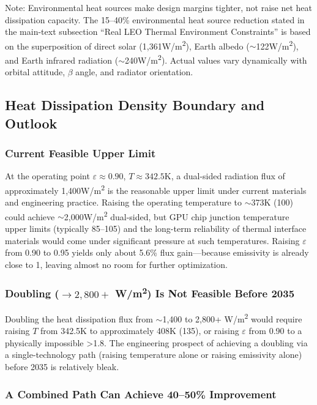 Note: Environmental heat sources make design margins tighter, not raise net heat dissipation capacity. The 15--40\% environmental heat source reduction stated in the main-text subsection ``Real LEO Thermal Environment Constraints'' is based on the superposition of direct solar (1,361\;W/m\textsuperscript{2}), Earth albedo ($\sim$122\;W/m\textsuperscript{2}), and Earth infrared radiation ($\sim$240\;W/m\textsuperscript{2}). Actual values vary dynamically with orbital attitude, $\beta$ angle, and radiator orientation.

\subsection{Heat Dissipation Density Boundary and Outlook}

\subsubsection{Current Feasible Upper Limit}

At the operating point $\varepsilon\approx0.90$, $T\approx342.5$\;K, a dual-sided radiation flux of approximately 1,400\;W/m\textsuperscript{2} is the reasonable upper limit under current materials and engineering practice. Raising the operating temperature to $\sim$373\;K (100\unitC{}) could achieve $\sim$2,000\;W/m\textsuperscript{2} dual-sided, but GPU chip junction temperature upper limits (typically 85--105\unitC{}) and the long-term reliability of thermal interface materials would come under significant pressure at such temperatures. Raising $\varepsilon$ from 0.90 to 0.95 yields only about 5.6\% flux gain---because emissivity is already close to 1, leaving almost no room for further optimization.

\subsubsection{Doubling ($\to 2,800+$ W/m\textsuperscript{2}) Is Not Feasible Before 2035}

Doubling the heat dissipation flux from $\sim$1,400 to 2,800+ W/m\textsuperscript{2} would require raising $T$ from 342.5\;K to approximately 408\;K (135\unitC{}), or raising $\varepsilon$ from 0.90 to a physically impossible >1.8. The engineering prospect of achieving a doubling via a single-technology path (raising temperature alone or raising emissivity alone) before 2035 is relatively bleak.

\subsubsection{A Combined Path Can Achieve 40--50\% Improvement}

